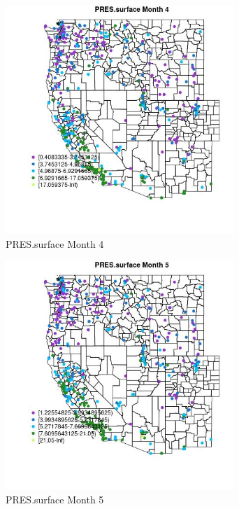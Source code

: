 \begin{figure} 
\centering  
\includegraphics[width=0.77\textwidth]{Code_Outputs/ML_input_report_ML_input_PM25_Step5_part_d_de_duplicated_aves_ML_input_MapObsMo4PRESsurface.jpg} 
\caption{\label{fig:ML_input_report_ML_input_PM25_Step5_part_d_de_duplicated_aves_ML_inputMapObsMo4PRESsurface}PRES.surface Month 4} 
\end{figure} 
 

\begin{figure} 
\centering  
\includegraphics[width=0.77\textwidth]{Code_Outputs/ML_input_report_ML_input_PM25_Step5_part_d_de_duplicated_aves_ML_input_MapObsMo5PRESsurface.jpg} 
\caption{\label{fig:ML_input_report_ML_input_PM25_Step5_part_d_de_duplicated_aves_ML_inputMapObsMo5PRESsurface}PRES.surface Month 5} 
\end{figure} 
 

